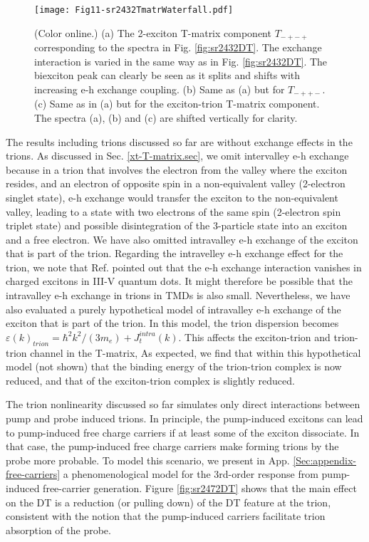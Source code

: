 \documentclass[aps,prb,superscriptaddress,letterpaper,amsmath,amssymb,twocolumn,preprintnumbers]{revtex4}
\begin{document}
\begin{figure}
	\centering
	\texttt{[image: Fig11-sr2432TmatrWaterfall.pdf]}
	\caption{
		(Color online.)
		(a) The 2-exciton T-matrix component   $T_{-+-+}$ corresponding to the spectra in Fig. \protect\ref{fig:sr2432DT}. The exchange interaction is varied in the
same way as in  Fig. \protect\ref{fig:sr2432DT}. The biexciton peak can clearly be seen as it splits and shifts with increasing e-h exchange coupling.
(b) Same as (a) but for  $T_{-++-}$.
(c) Same as in (a) but for the exciton-trion T-matrix component.
 The spectra (a), (b)  and (c) are  shifted vertically for clarity.	 }	
	\label{fig:sr2432TmatrWaterfall}
\end{figure}




The results including trions discussed so far are without exchange effects in the trions. As discussed in Sec. \ref{xt-T-matrix.sec},
we omit intervalley e-h exchange because in a trion that involves the electron from the valley where the exciton resides, and an electron of opposite spin in a non-equivalent valley (2-electron singlet state), e-h exchange would transfer the exciton to the non-equivalent valley, leading to a state with two electrons of the same spin (2-electron spin triplet state) and possible disintegration of the 3-particle state into an exciton and a free electron. We have also omitted intravalley e-h exchange of the exciton that is part of the trion. Regarding the intravelley  e-h exchange effect for the trion, we note that Ref. \cite{bayer-etal.2002} pointed out that the e-h exchange interaction vanishes in charged excitons in III-V quantum dots. It might therefore be possible that the intravalley e-h exchange in trions in TMDs is also small.
Nevertheless, we have also evaluated a purely
hypothetical model of   intravalley e-h exchange of the exciton that is part of the trion. In this model,
 the trion dispersion becomes
$\varepsilon(k)_{trion} = \hbar^2 k^2 / (3 m_e) + J^{intra}_{t}(k)$. This affects the exciton-trion and trion-trion channel in the T-matrix,
 As expected, we find that within this hypothetical model (not shown) that the binding energy of the trion-trion complex is now  reduced, and that of the exciton-trion complex is slightly reduced.



The trion nonlinearity discussed so far simulates only direct interactions between pump and probe induced trions.
In principle, the pump-induced excitons can lead to pump-induced free charge carriers if at least some of the exciton dissociate. In that case, the pump-induced free charge carriers make forming trions by the probe more probable. To model this scenario, we present in App. \ref{Sec:appendix-free-carriers} a phenomenological model for the 3rd-order response from pump-induced free-carrier generation. Figure \ref{fig:sr2472DT} shows that the main effect on the DT is a reduction (or pulling down) of the DT feature at the trion, consistent with the notion that the pump-induced carriers facilitate trion absorption of the probe.
\end{document}
